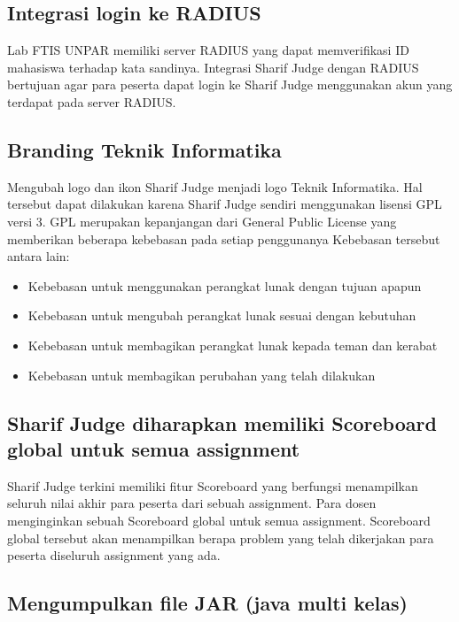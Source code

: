 \subsection{Integrasi login ke RADIUS}
Lab FTIS UNPAR memiliki server RADIUS yang dapat memverifikasi ID mahasiswa terhadap kata sandinya. Integrasi Sharif Judge dengan RADIUS bertujuan agar para peserta dapat login ke Sharif Judge menggunakan akun yang terdapat pada server RADIUS.

\subsection{Branding Teknik Informatika}
Mengubah logo dan ikon Sharif Judge menjadi logo Teknik Informatika. Hal tersebut dapat dilakukan karena Sharif Judge sendiri menggunakan lisensi GPL versi 3. GPL merupakan kepanjangan dari General Public License yang memberikan beberapa kebebasan pada setiap penggunanya %
Kebebasan tersebut antara lain:
	\begin{itemize}
		\item Kebebasan untuk menggunakan perangkat lunak dengan tujuan apapun \\
		\item Kebebasan untuk mengubah perangkat lunak sesuai dengan kebutuhan \\
		\item Kebebasan untuk membagikan perangkat lunak kepada teman dan kerabat \\
		\item Kebebasan untuk membagikan perubahan yang telah dilakukan
	\end{itemize}

\subsection{Sharif Judge diharapkan memiliki Scoreboard global untuk semua assignment}
Sharif Judge terkini memiliki fitur Scoreboard yang berfungsi menampilkan seluruh nilai akhir para peserta dari sebuah assignment. Para dosen menginginkan sebuah Scoreboard global untuk semua assignment. Scoreboard global tersebut akan menampilkan berapa problem yang telah dikerjakan para peserta diseluruh assignment yang ada.

\subsection{Mengumpulkan file JAR (java multi kelas)}
